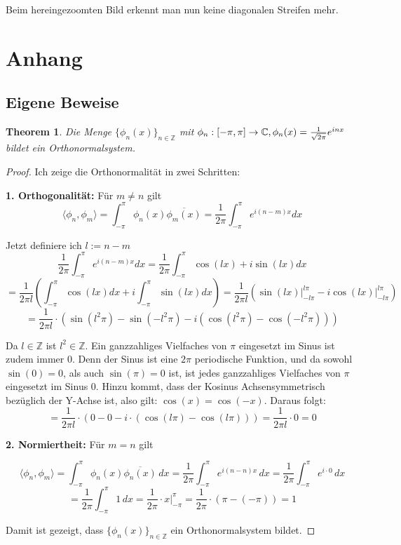 \documentclass[a4paper,12pt]{article}
\newtheorem{theorem}{Theorem}[section]
\theoremstyle{definition}
\theoremstyle{remark}
\begin{document}
Beim hereingezoomten Bild erkennt man nun keine diagonalen Streifen mehr. 

\section{Anhang}
        
\subsection{Eigene Beweise}
\begin{theorem}\label{thm:orthonorm}
Die Menge $\{\phi_n(x)\}_{n\in\mathbb{Z}}$ mit $\phi_n:[-\pi, \pi] \to \mathbb{C}, \\ \phi_n(x) = \frac{1}{\sqrt{2\pi}}e^{inx}$ bildet ein Orthonormalsystem.
\end{theorem}
        
\begin{proof}
Ich zeige die Orthonormalität in zwei Schritten: 
            
\textbf{1. Orthogonalität:}  
Für $m \neq n$ gilt
$$\langle \phi_n, \phi_m \rangle = \int_{-\pi}^{\pi}{\phi_n(x) \overline{\phi_m(x)}} = \frac{1}{2\pi}\int_{-\pi}^\pi{e^{i(n-m)x}dx}$$
        
Jetzt definiere ich $l := n-m$
\[\frac{1}{2\pi}\int_{-\pi}^\pi{e^{i(n-m)x}dx} = \frac{1}{2\pi}\int_{-\pi}^\pi{\cos(lx) + i \sin (lx)} dx\] 
\[= \frac{1}{2\pi l}\left(\int_{-\pi}^\pi{\cos (lx) dx} + i\int_{-\pi}^\pi{ \sin (lx) dx} \right)  = \frac{1}{2\pi l} \left(\sin(lx)\big|_{-l\pi}^{l\pi} - i\cos(lx)\big|_{-l\pi}^{l\pi} \right)\]
\[= \frac{1}{2\pi l} \cdot \left(\sin(l^2\pi) - \sin(-l^2\pi) - i\left(\cos(l^2\pi) - \cos(-l^2\pi)\right)\right) \]
        
Da $l\in \mathbb{Z}$ ist $l^2 \in \mathbb{Z}$. Ein ganzzahliges Vielfaches von $\pi$
eingesetzt im Sinus ist zudem immer 0. Denn der Sinus ist eine $2\pi$ periodische Funktion, und da
sowohl $\sin(0) = 0$, als auch $\sin (\pi) = 0$ ist, ist jedes ganzzahliges Vielfaches von $\pi$ eingesetzt 
im Sinus 0. Hinzu kommt, dass der Kosinus Achsensymmetrisch bezüglich der Y-Achse ist, also gilt:
$\cos (x) =  \cos (-x)$. Daraus folgt:
\[= \frac{1}{2\pi l} \cdot (0 - 0 - i\cdot(\cos(l\pi) - \cos(l\pi))) = \frac{1}{2\pi l} \cdot 0 = 0\]      
        
\textbf{2. Normiertheit:}  
Für $m = n$ gilt
        
\[\langle \phi_n, \phi_m \rangle = \int_{-\pi}^{\pi} \phi_n(x) \overline{\phi_n(x)} \, dx = \frac{1}{2\pi} \int_{-\pi}^{\pi} e^{i(n -n) x}\, dx = \frac{1}{2\pi} \int_{-\pi}^{\pi} e^{i\cdot0} \, dx\]        
\[= \frac{1}{2\pi} \int_{-\pi}^{\pi} 1 \, dx = \frac{1}{2\pi} \cdot x \Big|_{-\pi}^{\pi} = \frac{1}{2\pi} \cdot (\pi-(-\pi)) = 1\]
        
Damit ist gezeigt, dass $\{\phi_n(x)\}_{n\in\mathbb{Z}}$ ein Orthonormalsystem bildet.
\end{proof}
\end{document}
